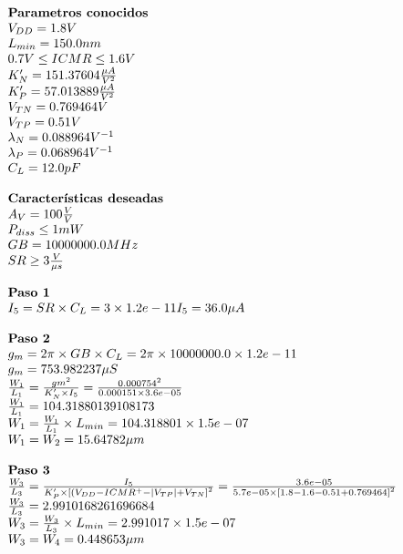 \begin{equation}
	\begin{array}{l l}
		\textbf{Parametros conocidos} \\
		V_{DD} =  1.8  V \\
		L_{min} =  150.0  nm \\
		0.7 V \leq ICMR \leq 1.6 V \\
		K'_{N} =  151.37604  \frac{\mu A}{V^{2}} \\
		K'_{P} =  57.013889  \frac{\mu A}{V^{2}} \\
		V_{TN} =  0.769464  V \\
		V_{TP} =  0.51  V \\
		\lambda_{N} =  0.088964  V^{-1} \\
		\lambda_{P} =  0.068964  V^{-1} \\
		C_{L} =  12.0  pF \\
		\\
		\textbf{Características deseadas} \\
		A_{V} =  100  \frac{V}{V} \\
		P_{diss} \leq  1  mW \\
		GB =  10000000.0  MHz \\
		SR \geq  3  \frac{V}{\mu s} \\
		\\
		\textbf{Paso 1} \\
		I_{5} = SR \times C_{L} = 3\times1.2e-11
		I_{5} =  36.0 \mu A \\
		\\
		\textbf{Paso 2} \\
		g_{m} = 2\pi{} \times GB \times C_{L} = 2 \pi{} \times10000000.0\times 1.2e-11  \\
		g_{m} =  753.982237  \mu S \\
		\frac{W_1}{L_1} = \frac{gm^2}{K'_{N}\times I_5} = \frac{0.000754^2}{0.000151\times3.6e-05}\\
		\frac{W_1}{L_1} =  104.31880139108173  \\
		W_{1} = \frac{W_1}{L_1} \times L_{min} =  104.318801 \times 1.5e-07  \\
		W_{1} = W_{2} =  15.64782  \mu m \\
		\\
		\textbf{Paso 3} \\
		\frac{W_3}{L_3} = \frac{I_5}{K'_{P}\times \left[(V_{DD}-ICMR^{+}-|V_{TP}|+V_{TN}\right]^{2}} = \frac{ 3.6e-05 }{ 5.7e-05 \times \left[ 1.8 - 1.6 - 0.51 + 0.769464 \right]^{2}} \\
		\frac{W_3}{L_3} =  2.9910168261696684  \\
		W_{3} = \frac{W_3}{L_3} \times L_{min} =  2.991017 \times 1.5e-07  \\
		W_{3} = W_{4} =  0.448653  \mu m \\
		\\
	\end{array}
\end{equation}

